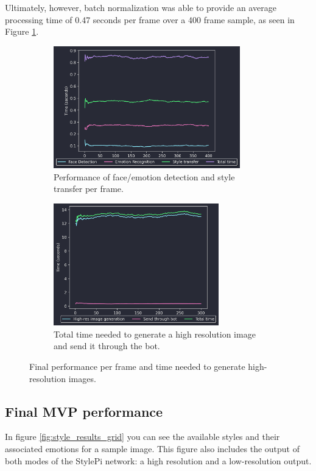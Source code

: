 Ultimately, however, batch normalization was able to provide an average processing time of 0.47 seconds per frame over a 400 frame sample, as seen in Figure \ref{fig:finalFPS}.

\begin{figure}[h]
    \centering
    \begin{subfigure}[t]{0.45\textwidth}
        \centering
        \includegraphics[height = 5.3cm]{resources/finalFPS.png}
        \caption{Performance of face/emotion detection and style transfer per frame.}\label{fig:finalFPS}
    \end{subfigure}
    \begin{subfigure}[t]{0.45\textwidth}
        \centering
        \includegraphics[height =5.3cm]{resources/result_generation_time.png}
        \caption{Total time needed to generate a high resolution image and send it through the bot.}
        \label{fig:result_generation_time}
    \end{subfigure}
    \caption{Final performance per frame and time needed to generate high-resolution images.}\label{fig:final_results_big_fig}
\end{figure}

\subsection{Final MVP performance}

In figure \ref{fig:style_results_grid} you can see the available styles and their associated emotions for a sample image. This figure also includes the output of both modes of the StylePi network: a high resolution and a low-resolution output.

